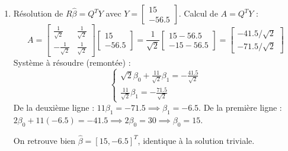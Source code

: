 \documentclass[solutions]{../exercices}
\begin{document}
\begin{solution}
\begin{enumerate}
        \item Résolution de $R \hat{\beta} = Q^T Y$ avec $Y = \begin{bmatrix} 15 \\ -56.5 \end{bmatrix}$.
        Calcul de $A = Q^T Y$ :
        \[
            A = \begin{bmatrix} \frac{1}{\sqrt{2}} & \frac{1}{\sqrt{2}} \\ -\frac{1}{\sqrt{2}} & \frac{1}{\sqrt{2}} \end{bmatrix} \begin{bmatrix} 15 \\ -56.5 \end{bmatrix}
            = \frac{1}{\sqrt{2}} \begin{bmatrix} 15 - 56.5 \\ -15 - 56.5 \end{bmatrix}
            = \begin{bmatrix} -41.5/\sqrt{2} \\ -71.5/\sqrt{2} \end{bmatrix}
        \]
        Système à résoudre (remontée) :
        \[
        \begin{cases}
            \sqrt{2} \beta_0 + \frac{11}{\sqrt{2}} \beta_1 = -\frac{41.5}{\sqrt{2}} \\
            \frac{11}{\sqrt{2}} \beta_1 = -\frac{71.5}{\sqrt{2}}
        \end{cases}
        \]
        De la deuxième ligne : $11 \beta_1 = -71.5 \implies \beta_1 = -6.5$.
        De la première ligne : $2 \beta_0 + 11(-6.5) = -41.5 \implies 2 \beta_0 = 30 \implies \beta_0 = 15$.

        On retrouve bien $\hat{\beta} = [15, -6.5]^T$, identique à la solution triviale.
    \end{enumerate}
\end{solution}
\end{document}
